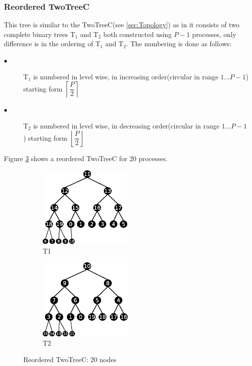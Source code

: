 \documentclass[sigplan,review,anonymous]{acmart}\settopmatter{printfolios=true,printccs=false,printacmref=false}
\begin{document}
\subsubsection{Reordered TwoTreeC}
This tree is similar to the TwoTreeC(see \ref{sec:Topology}) as in it consists of two complete binary trees T$_{1}$ and T$_{2}$ both constructed using $P-1$ processes, only difference is in the ordering of T$_{1}$ and T$_{2}$. The numbering is done as follows:
 \begin{description}
     \item[$\bullet$]T$_{1}$ is numbered in level wise, in increasing order(circular in range $1...P-1$) starting form $\left \lceil{\dfrac{P}{2}}\right \rceil$
     \item[$\bullet$] T$_{2}$ is numbered in level wise, in decreasing order(circular in range $1...P-1$) starting form $\left \lfloor{\dfrac{P}{2}}\right\rfloor $
 \end{description}
Figure \ref{fig:reordered} shows a reordered TwoTreeC for 20 processes.

 \begin{figure}[h]
 
\begin{subfigure}{0.5\textwidth}
\includegraphics[width=0.5\linewidth, height=4cm]{images/reordered-twoTreeC-T1.eps} 
\caption{T1}
\label{fig:RT1}
\end{subfigure}
\begin{subfigure}{0.5\textwidth}
\includegraphics[width=0.5\linewidth, height=4cm]{images/reordered-twoTreeC-T2.eps}
\caption{T2}
\label{fig:RT2}
\end{subfigure}
 
\caption{Reordered TwoTreeC: 20 nodes}
\label{fig:reordered}
\end{figure}
\end{document}

